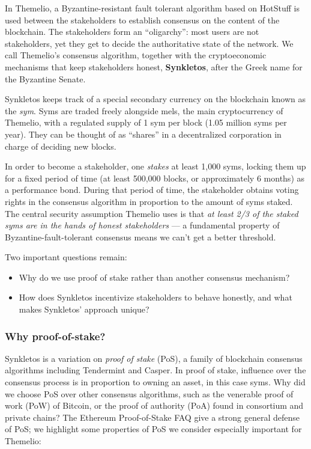 \documentclass[headinclude,12pt]{scrbook}
\begin{document}
In Themelio, a Byzantine-resistant fault tolerant algorithm based on
HotStuff is used between the stakeholders to establish consensus on the
content of the blockchain. The stakeholders form an ``oligarchy'': most
users are not stakeholders, yet they get to decide the authoritative
state of the network. We call Themelio's consensus algorithm, together
with the cryptoeconomic mechanisms that keep stakeholders honest,
\textbf{Synkletos}, after the Greek name for the Byzantine Senate.

Synkletos keeps track of a special secondary currency on the blockchain
known as the \emph{sym}. Syms are traded freely alongside mels, the main
cryptocurrency of Themelio, with a regulated supply of 1 sym per block
(1.05 million syms per year). They can be thought of as ``shares'' in a
decentralized corporation in charge of deciding new blocks.

In order to become a stakeholder, one \emph{stakes} at least 1,000 syms,
locking them up for a fixed period of time (at least 500,000 blocks, or
approximately 6 months) as a performance bond. During that period of
time, the stakeholder obtains voting rights in the consensus algorithm
in proportion to the amount of syms staked. The central security
assumption Themelio uses is that \emph{at least 2/3 of the staked syms
    are in the hands of honest stakeholders} --- a fundamental property of
Byzantine-fault-tolerant consensus means we can't get a better
threshold.

Two important questions remain:

\begin{itemize}
    \item
          Why do we use proof of stake rather than another consensus mechanism?
    \item
          How does Synkletos incentivize stakeholders to behave honestly, and
          what makes Synkletos' approach unique?
\end{itemize}

\subsubsection{Why proof-of-stake?}

Synkletos is a variation on \emph{proof of stake} (PoS), a family of
blockchain consensus algorithms including Tendermint and Casper. In
proof of stake, influence over the consensus process is in proportion to
owning an asset, in this case syms. Why did we choose PoS over other
consensus algorithms, such as the venerable proof of work (PoW) of
Bitcoin, or the proof of authority (PoA) found in consortium and private
chains? The Ethereum Proof-of-Stake FAQ \cite{buterin2019pos} give a
strong general defense of PoS; we highlight some properties of PoS we
consider especially important for Themelio:
\end{document}
